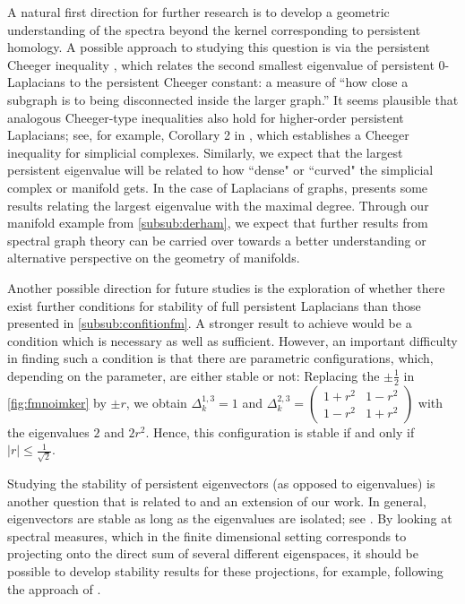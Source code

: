 \documentclass[11pt]{article}
\theoremstyle{definition}
\theoremstyle{remark}
\begin{document}
A natural first direction for further research is to develop a geometric understanding of the spectra beyond the kernel corresponding to persistent homology. A possible approach to studying this question is via the persistent Cheeger inequality \citep[Theorem 4.20]{mww}, which relates the second smallest eigenvalue of persistent 0-Laplacians to the persistent Cheeger constant: a measure of ``how close a subgraph is to being disconnected inside the larger graph.'' It seems plausible that analogous Cheeger-type inequalities also hold for higher-order persistent Laplacians; see, for example, Corollary 2 in \citet{cheeger_sc}, which establishes a Cheeger inequality for simplicial complexes.  Similarly, we expect that the largest persistent eigenvalue will be related to how ``dense" or ``curved" the simplicial complex or manifold gets. In the case of Laplacians of graphs, \citet[\S4]{graph_1} presents some results relating the largest eigenvalue with the maximal degree.  Through our manifold example from \cref{subsub:derham}, we expect that further results from spectral graph theory can be carried over towards a better understanding or alternative perspective on the geometry of manifolds.

Another possible direction for future studies is the exploration of whether there exist further conditions for stability of full persistent Laplacians than those presented in \cref{subsub:confitionfm}. A stronger result to achieve would be a condition which is necessary as well as sufficient. However, an important difficulty in finding such a condition is that there are parametric configurations, which, depending on the parameter, are either stable or not: Replacing the $\pm \frac 1 2$ in \cref{fig:fmnoimker} by $\pm r$, we obtain $\Delta_k^{1,3}=1$ and $\Delta_k^{2,3} = \begin{pmatrix}
    1+r^2 & 1-r^2\\ 1-r^2 & 1+r^2
\end{pmatrix}$ with the eigenvalues $2$ and $2r^2$. Hence, this configuration is stable if and only if $|r| \le \frac 1 {\sqrt 2}$.

Studying the stability of persistent eigenvectors (as opposed to eigenvalues) is another question that is related to and an extension of our work. In general, eigenvectors are stable as long as the eigenvalues are isolated; see \citet[\S2.4 and 2.5]{numla}. By looking at spectral measures, which in the finite dimensional setting corresponds to projecting onto the direct sum of several different eigenspaces, it should be possible to develop stability results for these projections, for example, following the approach of \citet{powerspectrum}.
\end{document}
